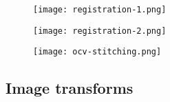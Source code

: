 
\begin{frame}
\begin{figure}
\centering
\texttt{[image: registration-1.png]}
\end{figure}
\end{frame}


\begin{frame}
\begin{figure}
\centering
\texttt{[image: registration-2.png]}
\end{figure}
\end{frame}


\begin{frame}
\begin{figure}
\centering
\texttt{[image: ocv-stitching.png]}
\end{figure}
\end{frame}

%
%
%
%


\subsection{Image transforms}



